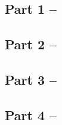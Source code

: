 \subsection{Part 1 -- }

\initialbox
\subsection{Part 2 -- }

\initialbox
\subsection{Part 3 -- }

\initialbox
\subsection{Part 4 -- }
\initialbox
